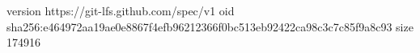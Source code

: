 version https://git-lfs.github.com/spec/v1
oid sha256:e464972aa19ae0e8867f4efb96212366f0bc513eb92422ca98c3c7c85f9a8c93
size 174916
